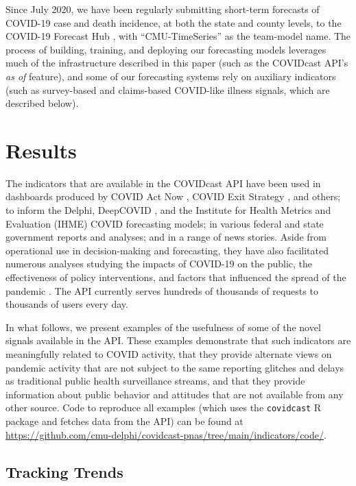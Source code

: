 \documentclass[9pt,twocolumn,twoside,lineno]{pnas-new}
\begin{document}
Since July 2020, we have been regularly submitting short-term forecasts of
COVID-19 case and death incidence, at both the state and county levels, to the 
COVID-19 Forecast Hub \cite{ForecastHub}, with ``CMU-TimeSeries'' as the
team-model name.  The process of building, training, and deploying our
forecasting models leverages much of the infrastructure described in this paper
(such as the COVIDcast API's \textit{as of} feature), and some of our
forecasting systems rely on auxiliary indicators (such as survey-based and
claims-based COVID-like illness signals, which are described below).

\section{Results}

The indicators that are available in the COVIDcast API have been used in
dashboards produced by COVID Act Now \cite{CovidActNow}, COVID Exit Strategy
\cite{CovidExitStrategy}, and others; to inform the Delphi, DeepCOVID
\cite{Rodriguez:2021}, and the Institute for Health Metrics and Evaluation
(IHME) \cite{IHMEProj} COVID forecasting models; in various federal and state
government reports and analyses; and in a range of news stories. Aside from
operational use in decision-making and forecasting, they have also facilitated
numerous analyses studying the impacts of COVID-19 on the public, the
effectiveness of policy interventions, and factors that influenced the spread of
the pandemic \cite{Adjodah:2021, Pierri:2021, Jewell:2021, Chakrabarti:2020,
  Doerr:2021, Rebeiro:2021}. The API currently serves hundreds of thousands of
requests to thousands of users every day.

In what follows, we present examples of the usefulness of some of the novel
signals available in the API. These examples demonstrate that such indicators
are meaningfully related to COVID activity, that they provide alternate views on
pandemic activity that are not subject to the same reporting glitches and delays
as traditional public health surveillance streams, and that they provide
information about public behavior and attitudes that are not available from any
other source. Code to reproduce all examples (which uses the \texttt{covidcast}
R package and fetches data from the API) can be found at
\url{https://github.com/cmu-delphi/covidcast-pnas/tree/main/indicators/code/}.

\subsection{Tracking Trends}
\end{document}
